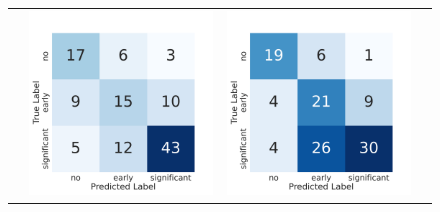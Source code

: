 \begin{figure}[H]
\begin{tabular}{r c c c }
    &
    \includegraphics[width=\BW\textwidth]{figures/confusion_matrix/cropped_seed1/OffTheShelfABMIL.pdf}
    &
    \includegraphics[width=\BW\textwidth]{figures/confusion_matrix/cropped_seed2/OffTheShelfABMIL.pdf}

\end{tabular}
\end{figure}
